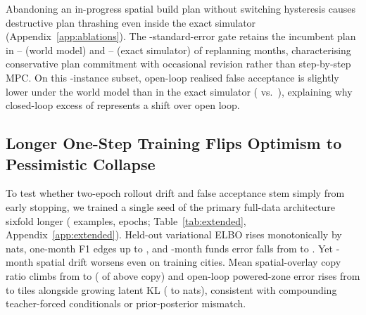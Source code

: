 \ReplanParagraph

\ifRpOn\ifRpKeptEmuOn Abandoning an in-progress spatial build plan without switching hysteresis causes destructive plan thrashing even inside the exact simulator (Appendix~\ref{app:ablations}). The \RpSwitchSe{}-standard-error gate retains the incumbent plan in \RpKeptEmuMin{}--\RpKeptEmuMax{} (world model) and \RpKeptPerfMin{}--\RpKeptPerfMax{} (exact simulator) of \RpKeptOf{} replanning months, characterising conservative plan commitment with occasional revision rather than step-by-step MPC.\fi{} On this \RpN{}-instance subset, open-loop realised false acceptance is slightly lower under the world model than in the exact simulator (\RpEmuOpenHack{} vs.\ \RpPerfOpenHack{}), explaining why closed-loop excess of \RpRaEst{} represents a \RpRbEst{} shift over open loop.\fi

\subsection{Longer One-Step Training Flips Optimism to Pessimistic Collapse}\label{sec:extended}

To test whether two-epoch rollout drift and false acceptance stem simply from early stopping, we trained a single seed of the primary \SizeM{} full-data architecture sixfold longer (\ExtTrSamples{} examples, \ExtTrEpochs{} epochs; Table~\ref{tab:extended}, Appendix~\ref{app:extended}). Held-out variational ELBO rises monotonically by \ExtTrTestElboGain{} nats, one-month F1 edges up to \ExtTrTestFOne{}, and \RollA-month funds error falls from \TestMainFunds{} to \ExtTrTestFunds{}. Yet \Horizon-month spatial drift worsens even on training cities. Mean spatial-overlay copy ratio climbs from \ExtTrBaseMeanOv{} to \ExtTrMeanOv{} (\ExtTrGeCopy{} of \HorOverlays{} above copy) and open-loop powered-zone error rises from \HorPowEmu{} to \ExtTrPowMae{} tiles alongside growing latent KL (\ExtTrKlStart{} to \ExtTrKlEnd{} nats), consistent with compounding teacher-forced conditionals or prior-posterior mismatch.

